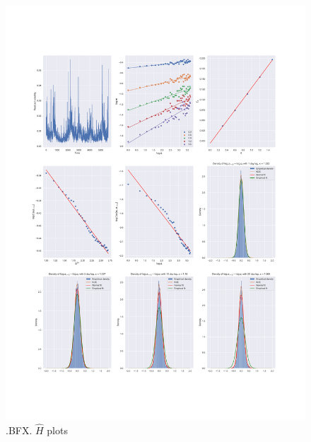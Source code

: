 	\begin{figure}[h]
		\centering
		\includegraphics[width=\linewidth]{fig/.BFX.pdf}
		\caption{.BFX. $\hat{H}$ plots}
	\end{figure}

